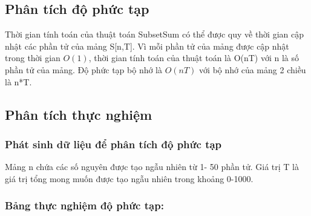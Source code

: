 \documentclass{article}
\begin{document}
\subsection{Phân tích độ phức tạp}
Thời gian tính toán của thuật toán SubsetSum có thể được quy về thời gian cập nhật các phần tử của mảng S[n,T]. Vì mỗi phần tử của mảng được cập nhật trong thời gian $O(1)$, thời gian tính toán của thuật toán là O(nT) với n là số phần tử của mảng.
Độ phức tạp bộ nhớ là $O(nT)$ với bộ nhớ của mảng 2 chiều là n*T.
\subsection{Phân tích thực nghiệm}
\subsubsection{Phát sinh dữ liệu để phân tích độ phức tạp}
Mảng n chứa các số nguyên được tạo ngẫu nhiên từ 1- 50 phần tử.
Giá trị T là giá trị tổng mong muốn được tạo ngẫu nhiên trong khoảng 0-1000.
\subsubsection{Bảng thực nghiệm độ phức tạp: }
\end{document}
